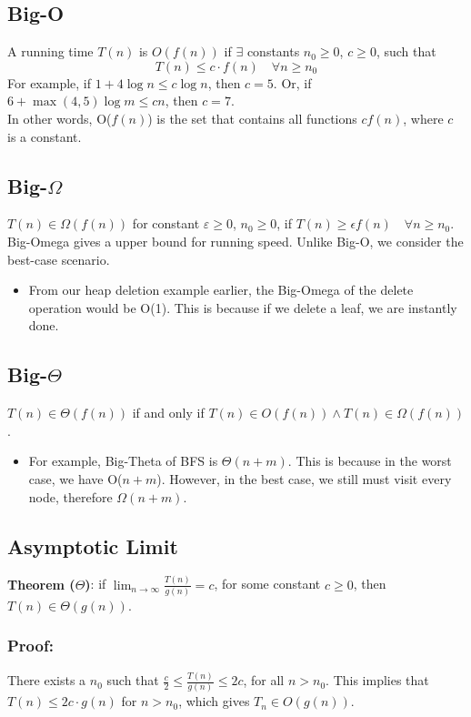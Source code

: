 \documentclass[10pt]{article}
\begin{document}
\subsection*{Big-O}
A running time $T(n)$ is $O(f(n))$ if $\exists$ constants $n_0 \geq 0$, $c \geq 0$, such that
\[T(n) \leq c \cdot f(n) \quad \forall n \geq n_0\]
For example, if $1 + 4\log n \leq c \log n$, then $c = 5$.  Or, if $6 + \max(4, 5) \log m \leq cn$, then $c = 7$.\\
In other words, O($f(n)$) is the set that contains all functions $c f(n)$, where $c$ is a constant.

\subsection*{Big-$\Omega$}
$T(n) \in \Omega(f(n))$ for constant $\varepsilon \geq 0$, $n_0 \geq 0$, if $T(n) \geq \epsilon f(n) \quad \forall n \geq n_0$.\\
Big-Omega gives a upper bound for running speed.  Unlike Big-O, we consider the best-case scenario.
\begin{itemize}
	\item From our heap deletion example earlier, the Big-Omega of the delete operation would be O(1).  This is because if we delete a leaf, we are instantly done.
\end{itemize}

\subsection*{Big-$\Theta$}
$T(n) \in \Theta(f(n))$ if and only if $T(n) \in O(f(n)) \land T(n) \in \Omega(f(n))$.
\begin{itemize}
	\item For example, Big-Theta of BFS is $\Theta(n + m)$.  This is because in the worst case, we have O($n + m$).  However, in the best case, we still must visit every node, therefore $\Omega(n + m)$.
\end{itemize}

\subsection*{Asymptotic Limit}
\textbf{Theorem ($\Theta$)}: if $\lim_{n \rightarrow \infty} \frac{T(n)}{g(n)} = c$, for some constant $c \geq 0$, then $T(n) \in \Theta(g(n))$.
\subsubsection*{Proof:}
There exists a $n_0$ such that $\frac{c}{2} \leq \frac{T(n)}{g(n)} \leq 2c$, for all $n > n_0$.  This implies that $T(n) \leq 2c \cdot g(n)$ for $n > n_0$, which gives $T_n \in O(g(n))$.
\end{document}
